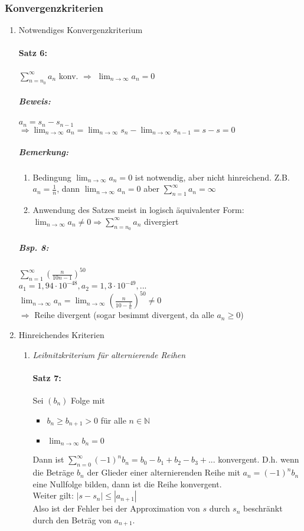 \subsubsection{Konvergenzkriterien}
\begin{enumerate} [label= \arabic*.]
\item Notwendiges Konvergenzkriterium
\paragraph{Satz 6:} $\sum_{n=n_0}^\infty a_n$ konv. $\Rightarrow$ $\lim_{n\to \infty} a_n = 0$
\subparagraph{Beweis:} $a_n = s_n - s_{n-1}$\\
$\Rightarrow \lim_{n\to \infty}a_n = \lim_{n\to\infty}s_n - \lim_{n\to\infty}s_{n-1}=s-s=0$
\subparagraph{Bemerkung:} 
\begin{enumerate}
\item Bedingung $\lim_{n\to\infty}a_n = 0$ ist notwendig, aber nicht hinreichend. Z.B. $a_n=\frac{1}{n}$, dann $\lim_{n\to\infty}a_n=0$ aber $\sum_{n=1}^\infty a_n=\infty$
\item Anwendung des Satzes meist in logisch äquivalenter Form: $\lim_{n \to \infty} a_n \not = 0 \Rightarrow \sum_{n=n_0}^\infty a_n$ divergiert
\end{enumerate}

\subparagraph{Bsp. 8:} $\sum_{n=1}^\infty \left(\frac{n}{10n-1}\right)^{50}$\\
$a_1=1,94\cdot 10^{-48}, a_2=1,3 \cdot 10^{-49}, ...$\\
$\lim_{n\to\infty}a_n=\lim_{n\to\infty}\left(\frac{n}{10-\frac{1}{n}}\right)^{50}\not = 0$\\
$\Rightarrow$ Reihe divergent (sogar besimmt divergent, da alle $a_n \geq 0$)

\item Hinreichendes Kriterien
\begin{enumerate}[label=(\Alph*)]
\item \emph{Leibnitzkriterium für alternierende Reihen}
\paragraph{Satz 7:} Sei $(b_n)$ Folge mit 
\begin{itemize}
\item $b_n \geq b_{n+1} > 0$ für alle $n \in \mathbb{N}$
\item $\lim_{n\to\infty} b_n = 0$
\end{itemize}
Dann ist $\sum_{n=0}^\infty(-1)^n b_n=b_0-b_1+b_2-b_3+...$ konvergent. D.h. wenn die Beträge $b_n$ der Glieder einer alternierenden Reihe mit $a_n = (-1)^n b_n$ eine Nullfolge bilden, dann ist die Reihe konvergent.\\
Weiter gilt: $|s-s_n| \leq | a_{n+1} |$\\
Also ist der Fehler bei der Approximation von $s$ durch $s_n$ beschränkt durch den Beträg von $a_{n+1}$.


\end{enumerate}
\end{enumerate}
